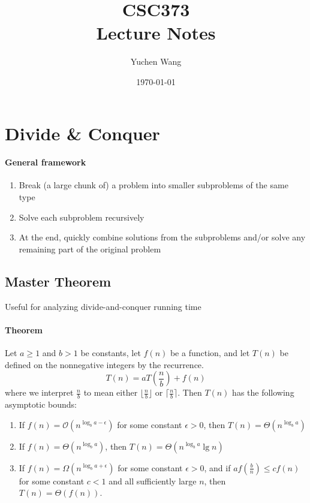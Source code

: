 \documentclass[11pt]{article}
\title{CSC373 \\ Lecture Notes}
\author{Yuchen Wang}
\date{\today}
\begin{document}
    \maketitle
    \tableofcontents
    \newpage
\section{Divide \& Conquer}
\paragraph{General framework}
\begin{enumerate}
	\item Break (a large chunk of) a problem into smaller subproblems of the same type
	\item Solve each subproblem recursively
	\item At the end, quickly combine solutions from the subproblems and/or solve any remaining part of the original problem
\end{enumerate}
\subsection{Master Theorem}
Useful for analyzing divide-and-conquer running time
\paragraph{Theorem}
Let $a \geq 1$ and $b > 1$ be constants, let $f(n)$ be a function, and let $	T(n)$ be defined on the nonnegative integers by the recurrence.
$$T(n) = aT(\frac{n}{b}) + f(n)$$
where we interpret $\frac{n}{b}$ to mean either $\lfloor \frac{n}{b} \rfloor$ or $\lceil \frac{n}{b} \rceil$. Then $T(n)$ has the following asymptotic bounds:
\begin{enumerate}
	\item If $f(n) = \mathcal{O}(n^{\log_b{a-\epsilon}})$ for some constant $\epsilon > 0$, then $T(n) = \Theta(n^{\log_b a})$
	\item If $f(n) = \Theta(n^{\log_b a})$, then $T(n) = \Theta(n^{\log_b a} \lg n)$
	\item If $f(n) = \Omega(n^{\log_b{a+\epsilon}})$ for some constant $\epsilon > 0$, and if $af(\frac{b}{n}) \leq cf(n)$ for some constant $c < 1$ and all sufficiently large $n$, then $T(n) = \Theta(f(n))$.	
\end{enumerate}
\end{document}
